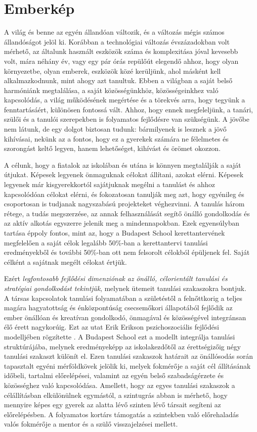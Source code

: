 \section{Emberkép}
\label{sec:gyerekkep}

A világ és benne az egyén állandóan változik, és a változás mégis számos állandóságot jelöl ki. Korábban a technológiai változás évszázadokban volt mérhető, az általunk használt eszközök száma és komplexitása jóval kevesebb volt, mára néhány év, vagy egy pár órás repülőút elegendő ahhoz, hogy olyan környezetbe, olyan emberek, eszközök közé kerüljünk, ahol másként kell alkalmazkodnunk, mint ahogy azt tanultuk. Ebben a világban a saját belső harmóniánk megtalálása, a saját közösségünkhöz, közösségeinkhez való kapcsolódás, a világ működésének megértése és a törekvés arra, hogy tegyünk a fenntartásáért, különösen fontossá vált. Ahhoz, hogy ennek megfeleljünk, a tanári, szülői és a tanulói szerepekben is folyamatos fejlődésre van szükségünk. A jövőbe nem látunk, de egy dolgot biztosan tudunk: bármilyenek is lesznek a jövő kihívásai, nekünk az a fontos, hogy ez a gyerekek számára ne félelmetes és szorongást keltő legyen, hanem lehetőséget, kihívást és örömet okozzon.

A célunk, hogy a fiatalok az iskolában és utána is könnyen megtalálják a saját útjukat. Képesek legyenek önmaguknak célokat állítani, azokat elérni. Képesek legyenek már kisgyerekkortól sajátjuknak megélni a tanulást és ahhoz kapcsolódóan célokat elérni, és fokozatosan tanulják meg azt, hogy egyénileg és csoportosan is tudjanak nagyszabású projekteket véghezvinni. A tanulás három rétege, a tudás megszerzése, az annak felhasználását segítő önálló gondolkodás és az aktív alkotás egyszerre jelenik meg a mindennapokban. Ezek egyensúlyban tartása éppoly fontos, mint az, hogy a Budapest School kerettantervének megfelelően a saját célok legalább 50\%-ban a kerettantervi tanulási eredményekből és további 50\%-ban ott nem felsorolt célokból épüljenek fel. Saját célként a sajátnak megélt célokat értjük.

Ezért \emph{legfontosabb fejlődési dimenziónak az önálló, célorientált tanulási és stratégiai gondolkodást tekintjük}, melynek ütemeit tanulási szakaszokra bontjuk. A társas kapcsolatok tanulási folyamatában a születéstől a felnőttkorig a teljes magára hagyatottság és énközpontúság csecsemőkori állapotából fejlődik az ember önállóan és kreatívan gondolkodó, önmagával és közösségével integránsan élő érett nagykorúig. Ezt az utat Erik Erikson pszichoszociális fejlődési modelljében rögzítette \citep{Erikson91}. A Budapest School ezt a modellt integrálja tanulási struktúrájába, melynek eredményeképp az iskolakezdőtől az érettségizőig négy tanulási szakaszt különít el. Ezen tanulási szakaszok határait az önállósodás során tapasztalt egyéni mérföldkövek jelölik ki, melyek fokmérője a saját cél állításának időbeli, tartalmi előrelépései, valamint az egyén belső szabadságérzete és közösséghez való kapcsolódása. Amellett, hogy az egyes tanulási szakaszok  a célállításban elkülönülnek egymástól, a szintugrás abban is mérhető, hogy mennyire képes egy gyerek az alatta lévő szinten lévő társait segíteni az előrelépésben. A folyamatos kortárs támogatás a szintekben való előrehaladás valós fokmérője a mentor és a szülő visszajelzései mellett.

